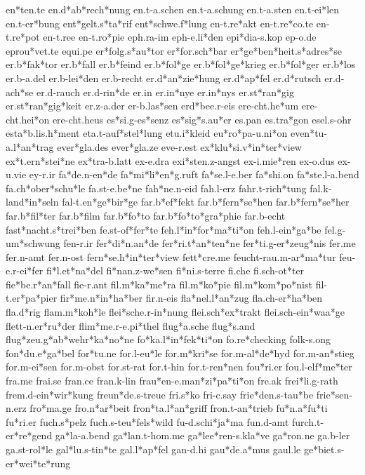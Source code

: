 en*ten.te
en.d*ab*rech*nung
en.t-a.schen
en.t-a.schung
en.t-a.sten
en.t-ei*len
en.t-er*bung
ent*gelt.s*ta*rif
ent*schwe.f*lung
en-t.re*akt
en-t.re*co.te
en-t.re*pot
en-t.ree
en-t.ro*pie
eph.ra-im
eph-e.li*den
epi*dia-s.kop
ep-o.de
eprou*vet.te
equi.pe
er*folg.s*au*tor
er*for.sch*bar
er*ge*ben*heit.s*adres*se
er.b*fak*tor
er.b*fall
er.b*feind
er.b*fol*ge
er.b*fol*ge*krieg
er.b*fol*ger
er.b*los
er.b-a.del
er.b-lei*den
er.b-recht
er.d*an*zie*hung
er.d*ap*fel
er.d*rutsch
er.d-ach*se
er.d-rauch
er.d-rin*de
er.in
er.in*nye
er.in*nys
er.st*ran*gig
er.st*ran*gig*keit
er.z-a.der
er-b.las*sen
erd*bee.r-eis
ere-cht.he*um
ere-cht.hei*on
ere-cht.heus
es*si.g-es*senz
es*sig*s.au*er
es.pan
es.tra*gon
esel.s-ohr
esta*b.lis.h*ment
eta.t-auf*stel*lung
etu.i*kleid
eu*ro*pa-u.ni*on
even*tu-a.l*an*trag
ever*gla.des
ever*gla.ze
eve-r.est
ex*klu*si.v*in*ter*view
ex*t.ern*stei*ne
ex*tra-b.latt
ex-e.dra
exi*sten.z-angst
ex-i.mie*ren
ex-o.dus
ex-u.vie
ey-r.ir
fa*de.n-en*de
fa*mi*li*en*g.ruft
fa*se.l-e.ber
fa*shi.on
fa*ste.l-a.bend
fa.ch*ober*schu*le
fa.st-e.be*ne
fah*ne.n-eid
fah.l-erz
fahr.t-rich*tung
fal.k-land*in*seln
fal-t.en*ge*bir*ge
far.b*ef*fekt
far.b*fern*se*hen
far.b*fern*se*her
far.b*fil*ter
far.b*film
far.b*fo*to
far.b*fo*to*gra*phie
far.b-echt
fast*nacht.s*trei*ben
fe.st-of*fer*te
feh.l*in*for*ma*ti*on
feh.l-ein*ga*be
fel.g-um*schwung
fen-r.ir
fer*di*n.an*de
fer*ri.t*an*ten*ne
fer*ti.g-er*zeug*nis
fer.me
fer.n-amt
fer.n-ost
fern*se.h*in*ter*view
fett*cre.me
feucht-rau.m-ar*ma*tur
feu-e.r-ei*fer
fi*l.et*na*del
fi*nan.z-we*sen
fi*ni.s-terre
fi.che
fi.sch-ot*ter
fie*be.r*an*fall
fie-r.ant
fil.m*ka*me*ra
fil.m*ko*pie
fil.m*kom*po*nist
fil-t.er*pa*pier
fir*me.n*in*ha*ber
fir.n-eis
fla*nel.l*an*zug
fla.ch-er*ha*ben
fla.d*rig
flam.m*koh*le
flei*sche.r-in*nung
flei.sch*ex*trakt
flei.sch-ein*waa*ge
flett-n.er*ru*der
flim*me.r-e.pi*thel
flug*a.sche
flug*s.and
flug*zeu.g*ab*wehr*ka*no*ne
fo*ka.l*in*fek*ti*on
fo.re*checking
folk-s.ong
fon*du.e*ga*bel
for*tu.ne
for.l-eu*le
for.m*kri*se
for.m-al*de*hyd
for.m-an*stieg
for.m-ei*sen
for.m-obst
for.st-rat
for.t-hin
for.t-ren*nen
fou*ri.er
fou.l-elf*me*ter
fra.me
frai.se
fran.ce
fran.k-lin
frau*en-e.man*zi*pa*ti*on
fre.ak
frei*li.g-rath
frem.d-ein*wir*kung
freun*de.s-treue
fri.s*ko
fri-c.say
frie*den.s-tau*be
frie*sen-n.erz
fro*ma.ge
fro.n*ar*beit
fron*ta.l*an*griff
fron.t-an*trieb
fu*n.a*fu*ti
fu*ri.er
fuch.s*pelz
fuch.s-teu*fels*wild
fu-d.schi*ja*ma
fun.d-amt
furch.t-er*re*gend
ga*la-a.bend
ga*lan.t-hom.me
ga*lee*ren-s.kla*ve
ga*ron.ne
ga.b-ler
ga.st-rol*le
gal*lu.s-tin*te
gal.l*ap*fel
gan-d.hi
gau*de.a*mus
gaul.le
ge*biet.s-er*wei*te*rung
